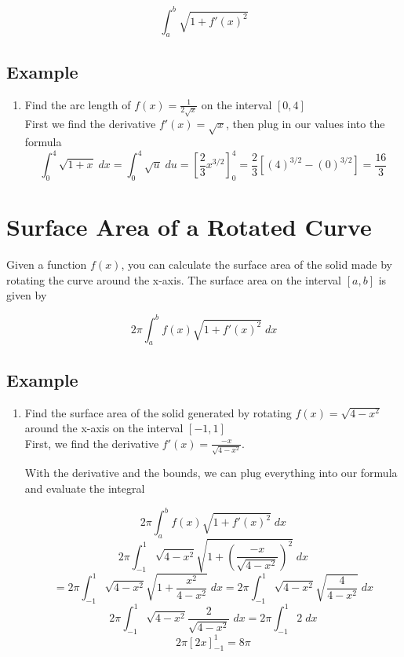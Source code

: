 \documentclass[12pt]{report}
\begin{document}
$$ \int_a^b \sqrt{1+f'(x)^2} $$

\subsection*{Example}
\begin{enumerate}
	\item Find the arc length of $f(x) = \frac{1}{2\sqrt{x}}$ on the interval $[0,4]$ \\
	
	First we find the derivative $f'(x) = \sqrt{x}$, then plug in our values into the formula
	$$ \int_0^4 \sqrt{1+x} \; dx = \int_0^4 \sqrt{u} \; du = \left[ \frac{2}{3} x^{3/2} \right]_0^4 = \frac{2}{3} \left[ (4)^{3/2} - (0)^{3/2} \right] = \frac{16}{3} $$
\end{enumerate}


\section{Surface Area of a Rotated Curve}

Given a function $f(x)$, you can calculate the surface area of the solid made by rotating the curve around the x-axis. The surface area on the interval $[a,b]$ is given by

$$ 2\pi \int_a^b f(x) \sqrt{1+f'(x)^2} \; dx $$

%


\subsection*{Example}

\begin{enumerate}
	\item Find the surface area of the solid generated by rotating $f(x) = \sqrt{4-x^2} $ around the x-axis on the interval $[-1,1]$ \\
	
	First, we find the derivative $ f'(x) = \frac{-x}{\sqrt{4-x^2}} $. 
	
	With the derivative and the bounds, we can plug everything into our formula and evaluate the integral
	
	$$ 2\pi \int_a^b f(x) \sqrt{1+f'(x)^2} \; dx $$
	$$ 2\pi \int_{-1}^{1} \sqrt{4-x^2} \sqrt{1 + \left( \frac{-x}{\sqrt{4-x^2}} \right)^2 } \; dx $$
	$$ = 2\pi \int_{-1}^{1} \sqrt{4-x^2} \sqrt{1 + \frac{x^2}{4-x^2} } \; dx = 2\pi \int_{-1}^{1} \sqrt{4-x^2} \sqrt{\frac{4}{4-x^2} } \; dx $$
	$$ 2\pi \int_{-1}^{1} \sqrt{4-x^2} \frac{2}{\sqrt{4-x^2}} \; dx = 2\pi \int_{-1}^{1} 2 \; dx $$
	$$ 2\pi \left[ 2x \right]_{-1}^{1} = 8\pi $$
\end{enumerate}
\end{document}
